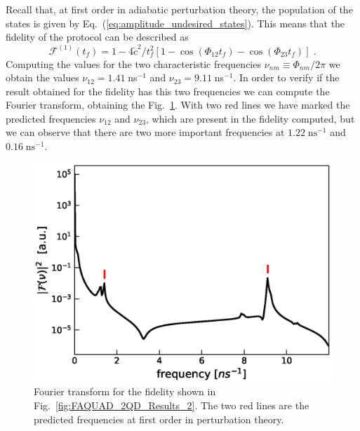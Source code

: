 \documentclass[a4paper,11pt]{article}
\begin{document}
Recall that, at first order in adiabatic perturbation theory, the population of the states is given by Eq.~(\ref{eq:amplitude_undesired_states}). This means that the fidelity of the protocol can be described as
\begin{equation}
	\mathcal{F}^{(1)}(t_f)=1-4\tilde{c}^2/t_f^2[1-\cos(\Phi_{12}t_f)-\cos(\Phi_{23}t_f)]\; .
\end{equation}
Computing the values for the two characteristic frequencies $\nu_{nm}\equiv \Phi_{nm}/2\pi$ we obtain the values $\nu_{12}=1.41\; $ns$^{-1}$ and $\nu_{23}=9.11\; $ns$^{-1}$. In order to verify if the result obtained for the fidelity has this two frequencies we can compute the Fourier transform, obtaining the Fig.~\ref{fig:frecuency_spectrum}. With two red lines we have marked the predicted frequencies $\nu_{12}$ and $\nu_{23}$, which are present in the fidelity computed, but we can observe that there are two more important frequencies at $1.22\; \text{ns}^{-1}$ and $0.16\; \text{ns}^{-1}$.
\begin{figure}[!htbp]
	\centering
	\includegraphics[width=0.7\linewidth]{frecuency_spectrum.eps}
	\caption{Fourier transform for the fidelity shown in Fig.~\ref{fig:FAQUAD_2QD_Results_2}. The two red lines are the predicted frequencies at first order in perturbation theory.}
	\label{fig:frecuency_spectrum}
\end{figure} 
\end{document}
